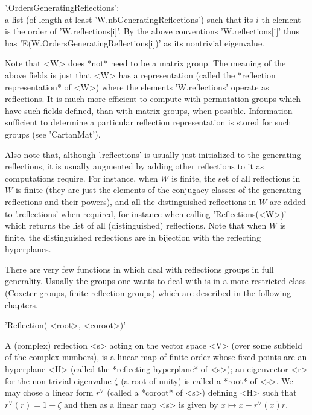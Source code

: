 '.OrdersGeneratingReflections':\\ a list (of length at least
  'W.nbGeneratingReflections')   such  that   its  $i$-th   element  is
  the   order  of   'W.reflections[i]'.   By   the  above   conventions
  'W.reflections[i]' thus  has 'E(W.OrdersGeneratingReflections[i])' as
  its nontrivial eigenvalue.

Note that <W> does  *not* need to be a matrix group.  The meaning of the
above  fields  is  just  that  <W>  has  a  representation  (called  the
*reflection representation*  of <W>) where the  elements 'W.reflections'
operate  as reflections.  It  is  much more  efficient  to compute  with
permutation  groups which  have such  fields defined,  than with  matrix
groups, when possible. Information  sufficient to determine a particular
reflection representation is stored for such groups (see 'CartanMat').

Also  note that, although '.reflections' is usually just initialized to the
generating reflections, it is usually augmented by adding other reflections
to it as computations require. For instance, when $W$ is finite, the set of
all  reflections  in  $W$  is  finite  (they  are  just the elements of the
conjugacy  classes of the generating reflections and their powers), and all
the  distinguished  reflections  in  $W$  are  added to '.reflections' when
required,  for instance  when calling  'Reflections(<W>)' which returns the
list  of all (distinguished) reflections. Note that when $W$ is finite, the
distinguished reflections are in bijection with the reflecting hyperplanes.

There are  very few functions  in {\CHEVIE} which deal  with reflections
groups in full generality. Usually the groups one wants to deal with is
in a more  restricted class (Coxeter groups,  finite reflection groups)
which are described in the following chapters.


'Reflection( <root>, <coroot>)'

A  (complex)  reflection  <s>  acting  on  the  vector space <V> (over some
subfield  of the complex  numbers), is a  linear map of  finite order whose
fixed  points are an hyperplane <H>  (called the *reflecting hyperplane* of
<s>);  an eigenvector <r> for the non-trivial eigenvalue $\zeta$ (a root of
unity)  is called  a *root*  of <s>.  We may  chose a  linear form $r^\vee$
(called  a *coroot* of <s>) defining  <H> such that $r^\vee(r)=1-\zeta$ and
then as a linear map <s> is given by $ x\mapsto x-r^\vee(x)r$.

